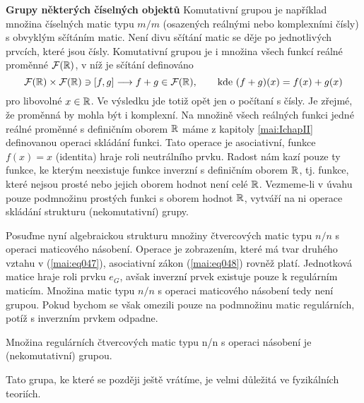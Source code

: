 \begin{mdframed}[style=mdexam]
  \begin{example}\label{mai:exam050}
    \textbf{Grupy některých číselných objektů}\newline
      Komutativní grupou je například množina číselných matic typu \(m/m\) (osazených reálnými nebo
      komplexními čísly) s obvyklým sčítáním matic. Není divu sčítání matic se děje po jednotlivých
      prvcích, které jsou čísly. Komutativní grupou je i množina všech funkcí reálné proměnné
      \(\mathcal{F}(\mathbb{R})\), v níž je sčítání definováno 
      \begin{equation*}
        \mathcal{F}(\mathbb{R})\times\mathcal{F}(\mathbb{R})\ni[f,g]\longrightarrow
        f + g \in\mathcal{F}(\mathbb{R}), \qquad\text{kde } (f+g)(x) = f(x) + g(x)
      \end{equation*}
      pro libovolné \(x \in\mathbb{R}\). Ve výsledku jde totiž opět jen o počítaní s čísly. Je zřejmé,
      že proměnná by mohla být i komplexní. Na množině všech reálných funkci jedné reálné proměnné s
      definičním oborem \(\mathbb{R}\) máme z kapitoly \ref{mai:IchapII} definovanou operaci skládání
      funkci. Tato operace je asociativní, funkce \(f(x) = x\) (identita) hraje roli neutrálního
      prvku. Radost nám kazí pouze ty funkce, ke kterým neexistuje funkce inverzní s definičním
      oborem \(\mathbb{R}\), tj. funkce, které nejsou prosté nebo jejich oborem hodnot není celé
      \(\mathbb{R}\). Vezmeme-li v úvahu pouze podmnožinu prostých funkci s oborem hodnot
      \(\mathbb{R}\), vytváří na ni operace skládání strukturu (nekomutativní) grupy. 
      
      Posuďme nyní algebraickou strukturu množiny čtvercových matic typu \(n/n\) s operaci
      maticového násobení. Operace je zobrazením, které má tvar druhého vztahu v (\ref{mai:eq047}),
      asociativní zákon (\ref{mai:eq048}) rovněž platí. Jednotková matice hraje roli prvku \(e_G\),
      avšak inverzní prvek existuje pouze k regulárním maticím. Množina matic typu \(n/n\) s operaci
      maticového násobení tedy není grupou. Pokud bychom se však omezili pouze na podmnožinu matic
      regulárních, potíž s inverzním prvkem odpadne. 
      
      \begin{mdframed}[style=highlight]
        Množina regulárních čtvercových matic typu n/n s operaci násobení je (nekomutativní) grupou.
      \end{mdframed}
      
      Tato grupa, ke které se později ještě vrátíme, je velmi důležitá ve fyzikálních teoriích. 
  \end{example}
\end{mdframed}